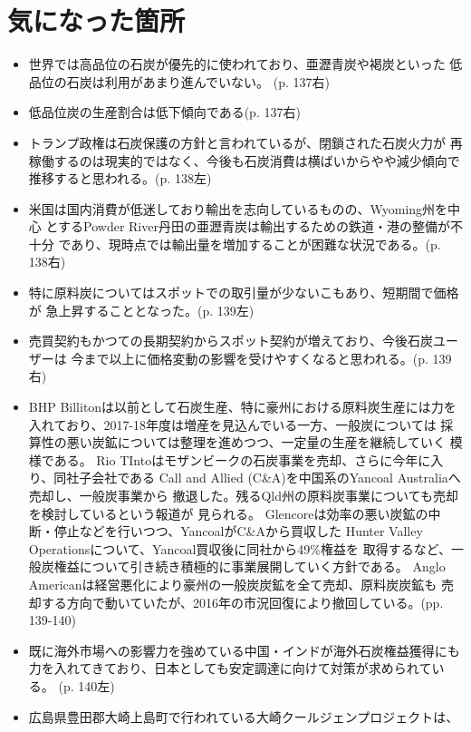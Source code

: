 \documentclass[a4j]{jsarticle}
\begin{document}
\section{気になった箇所}
\begin{itemize}
\item
  世界では高品位の石炭が優先的に使われており、亜瀝青炭や褐炭といった
  低品位の石炭は利用があまり進んでいない。 (p. 137右)
\item
  低品位炭の生産割合は低下傾向である(p. 137右)
\item
  トランプ政権は石炭保護の方針と言われているが、閉鎖された石炭火力が
  再稼働するのは現実的ではなく、今後も石炭消費は横ばいからやや減少傾向で
  推移すると思われる。(p. 138左)
\item
  米国は国内消費が低迷しており輸出を志向しているものの、Wyoming州を中心
  とするPowder River丹田の亜瀝青炭は輸出するための鉄道・港の整備が不十分
  であり、現時点では輸出量を増加することが困難な状況である。(p. 138右)
\item
  特に原料炭についてはスポットでの取引量が少ないこもあり、短期間で価格が
  急上昇することとなった。(p. 139左)
\item
  売買契約もかつての長期契約からスポット契約が増えており、今後石炭ユーザーは
  今まで以上に価格変動の影響を受けやすくなると思われる。(p. 139右)
\item
  BHP Billitonは以前として石炭生産、特に豪州における原料炭生産には力を
  入れており、2017-18年度は増産を見込んでいる一方、一般炭については
  採算性の悪い炭鉱については整理を進めつつ、一定量の生産を継続していく
  模様である。
  Rio TIntoはモザンビークの石炭事業を売却、さらに今年に入り、同社子会社である
  Call and Allied (C\&A)を中国系のYancoal Australiaへ売却し、一般炭事業から
  撤退した。残るQld州の原料炭事業についても売却を検討しているという報道が
  見られる。
  Glencoreは効率の悪い炭鉱の中断・停止などを行いつつ、YancoalがC\&Aから買収した
  Hunter Valley Operationsについて、Yancoal買収後に同社から49\%権益を
  取得するなど、一般炭権益について引き続き積極的に事業展開していく方針である。
  Anglo Americanは経営悪化により豪州の一般炭炭鉱を全て売却、原料炭炭鉱も
  売却する方向で動いていたが、2016年の市況回復により撤回している。(pp. 139-140)
\item
  既に海外市場への影響力を強めている中国・インドが海外石炭権益獲得にも
  力を入れてきており、日本としても安定調達に向けて対策が求められている。
  (p. 140左)
\item
  広島県豊田郡大崎上島町で行われている大崎クールジェンプロジェクトは、

\end{itemize}
\end{document}
